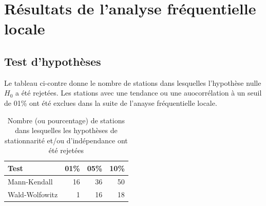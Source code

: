 \documentclass[
  letterpaper,
  DIV=11,
  numbers=noendperiod]{scrartcl}
\author{}
\date{}
\begin{document}
\pagestyle{mystyle}

\ifdefined\Shaded\renewenvironment{Shaded}{\begin{tcolorbox}[colback={codebgcolor}, sharp corners, borderline west={3pt}{0pt}{shadecolor}, enhanced, frame hidden, boxrule=0pt, breakable]}{\end{tcolorbox}}\fi

\hypertarget{ruxe9sultats-de-lanalyse-fruxe9quentielle-locale}{%
\section{Résultats de l'analyse fréquentielle
locale}\label{ruxe9sultats-de-lanalyse-fruxe9quentielle-locale}}

\hypertarget{test-dhypothuxe8ses}{%
\subsection{Test d'hypothèses}\label{test-dhypothuxe8ses}}

Le tableau ci-contre donne le nombre de stations dans lesquelles
l'hypothèse nulle \textbf{\(H_0\)} a été rejetées. Les stations avec une
tendance ou une auocorrélation à un seuil de 01\% ont été exclues dans
la suite de l'anayse fréquentielle locale.

\begin{table}
\caption{Nombre (ou pourcentage) de stations dans lesquelles les hypothèses de
stationnarité et/ou d'indépendance ont été rejetées}\tabularnewline

\centering
\begin{tabular}{lrrr}
\toprule
\textbf{Test} & \textbf{01\%} & \textbf{05\%} & \textbf{10\%}\\
\midrule
Mann-Kendall & 16 & 36 & 50\\
Wald-Wolfowitz & 1 & 16 & 18\\
\bottomrule
\end{tabular}
\end{table}
\end{document}
